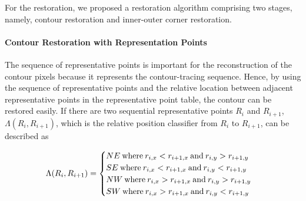 
For the restoration, we proposed a restoration algorithm comprising two stages, namely, contour restoration and inner-outer corner restoration.


\paragraph{Contour Restoration with Representation Points}


The sequence of representative points is important for the reconstruction of the contour pixels because it represents the contour-tracing sequence. Hence, by using the sequence of representative points and the relative location between adjacent representative points in the representative point table, the contour can be restored easily. If there are two sequential representative points $R_i$ and $R_{i+1}$, $\Lambda(R_i, R_{i+1})$, which is the relative position classifier from $R_i$ to $R_{i+1}$, can be described as 

\begin{equation}
	\Lambda(R_i, R_{i+1}) = \begin{cases}
	NE\: \text{where\:} r_{i,x} < r_{i+1,x}\: \text{and\:} r_{i,y} > r_{i+1,y} \\ 
	SE\: \text{where\:} r_{i,x} < r_{i+1,x}\: \text{and\:} r_{i,y} < r_{i+1,y} \\ 
	NW\: \text{where\:} r_{i,x} > r_{i+1,x}\: \text{and\:} r_{i,y} > r_{i+1,y} \\ 
	SW\: \text{where\:} r_{i,x} > r_{i+1,x}\: \text{and\:} r_{i,y} < r_{i+1,y}
	\end{cases}
	\label{eq:lambda}
\end{equation}

